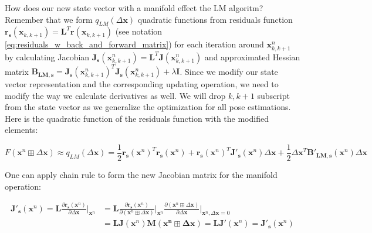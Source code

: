 \documentclass[a4paper]{report}
\numberwithin{figure}{section}
\begin{document}

How does our new state vector with a manifold effect the LM algoritm? 
Remember that we form $q_{LM}(\Delta \mathbf{x})$ quadratic functions 
from residuals function $\mathbf{r_s}(\mathbf{x}_{k,k+1})=\mathbf{L}^T\mathbf{r}(\mathbf{x}_{k,k+1})$ 
(see notation \eqref{eq:residuals_w_back_and_forward_matrix})
for each iteration around $\mathbf{x}^n_{k,k+1}$ by calculating Jacobian 
$\mathbf{J_s}(\mathbf{x}^n_{k,k+1})=\mathbf{L}^T\mathbf{J}(\mathbf{x}^n_{k,k+1})$
and 
approximated Hessian matrix 
$\mathbf{B_{LM,s}}=\mathbf{J_s}(\mathbf{x}^n_{k,k+1})^T\mathbf{J_s}(\mathbf{x}^n_{k,k+1}) + \lambda \mathbf{I}$.
Since we modify our state vector representation 
and the corresponding updating operation, we need to modify the way we calculate 
derivatives as well. We will drop $k,k+1$ subscript from the state vector 
as we generalize the 
optimization for all pose estimations. 
Here is the quadratic function of the residuals function with the modified elements:

\begin{equation}
  F(\mathbf{x}^n \boxplus \Delta \mathbf{x}) \approx 
  q_{LM} (\Delta \mathbf{x}) = 
  \frac{1}{2}
\mathbf{r_s}(\mathbf{x}^n)^T\mathbf{r_s}(\mathbf{x}^n) + 
\mathbf{r_s}(\mathbf{x}^n)^T\mathbf{J'_s}(\mathbf{x}^n)\Delta \mathbf{x} + 
\frac{1}{2} \Delta \mathbf{x}^T\mathbf{B'_{LM,s}}(\mathbf{x}^n)\Delta \mathbf{x}
\end{equation}

One can apply chain rule to form the new Jacobian matrix for the manifold operation:

\begin{equation}
  \begin{aligned}
  \mathbf{J'_s}(\mathbf{x}^n) = 
  \mathbf{L} \frac{\partial \mathbf{r_s}(\mathbf{x}^n)}
  {\partial \Delta \mathbf{x}} \bigg|_{\mathbf{x}^n} & = 
  \mathbf{L} \frac{\partial \mathbf{r_s}(\mathbf{x}^n)}
{\partial (\mathbf{x}^n \boxplus \Delta \mathbf{x})} \bigg|_{\mathbf{x}^n}
  \frac{\partial (\mathbf{x}^n \boxplus \Delta \mathbf{x})}
  {\partial \Delta \mathbf{x}} \bigg|_{\mathbf{x}^n,\Delta \mathbf{x}=0} \\
  & = 
  \mathbf{L}\mathbf{J}(\mathbf{x}^n) 
  \mathbf{M}(\mathbf{\mathbf{x}^n \boxplus \Delta \mathbf{x}})
  = 
  \mathbf{L}\mathbf{J'}(\mathbf{x}^n)
  = 
  \mathbf{J'_s}(\mathbf{x}^n)
\end{aligned}
\end{equation}\label{eq:new_jacobian_chain_rule}
\end{document}
